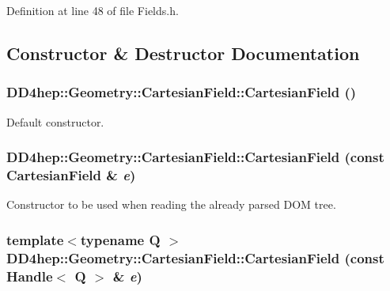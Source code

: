 Definition at line 48 of file Fields.h.

\subsection{Constructor \& Destructor Documentation}
\hypertarget{class_d_d4hep_1_1_geometry_1_1_cartesian_field_a65e67bc0e5d3481af8fefc0f1402aaaa}{
\subsubsection[{CartesianField}]{\setlength{\rightskip}{0pt plus 5cm}DD4hep::Geometry::CartesianField::CartesianField ()}}
\label{class_d_d4hep_1_1_geometry_1_1_cartesian_field_a65e67bc0e5d3481af8fefc0f1402aaaa}


Default constructor. \hypertarget{class_d_d4hep_1_1_geometry_1_1_cartesian_field_a9c038e6dc1accccbb1ba92cf0ac82d17}{
\subsubsection[{CartesianField}]{\setlength{\rightskip}{0pt plus 5cm}DD4hep::Geometry::CartesianField::CartesianField (const {\bf CartesianField} \& {\em e})}}
\label{class_d_d4hep_1_1_geometry_1_1_cartesian_field_a9c038e6dc1accccbb1ba92cf0ac82d17}


Constructor to be used when reading the already parsed DOM tree. \hypertarget{class_d_d4hep_1_1_geometry_1_1_cartesian_field_a9feb07987ef78617905c04b29d1f8668}{
\subsubsection[{CartesianField}]{\setlength{\rightskip}{0pt plus 5cm}template$<$typename Q $>$ DD4hep::Geometry::CartesianField::CartesianField (const {\bf Handle}$<$ Q $>$ \& {\em e})}}
\label{class_d_d4hep_1_1_geometry_1_1_cartesian_field_a9feb07987ef78617905c04b29d1f8668}


